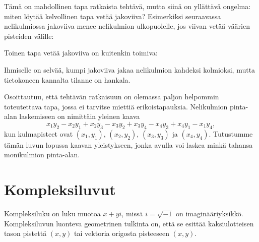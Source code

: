 Tämä on mahdollinen tapa ratkaista tehtävä,
mutta siinä on yllättävä ongelma:
miten löytää kelvollinen tapa vetää jakoviiva?
Esimerkiksi seuraavassa nelikulmiossa
jakoviiva menee nelikulmion ulkopuolelle,
jos viivan vetää väärien pisteiden välille:
\begin{center}
\end{center}
Toinen tapa vetää jakoviiva on kuitenkin toimiva:
\begin{center}
\end{center}
Ihmiselle on selvää, kumpi jakoviiva jakaa nelikulmion
kahdeksi kolmioksi, mutta tietokoneen kannalta
tilanne on hankala.

Osoittautuu, että tehtävän ratkaisuun on olemassa
paljon helpommin toteutettava tapa,
jossa ei tarvitse miettiä erikoistapauksia.
Nelikulmion pinta-alan laskemiseen
on nimittäin yleinen kaava
\[x_1y_2-x_2y_1+x_2y_3-x_3y_2+x_3y_4-x_4y_3+x_4y_1-x_1y_4,\]
kun kulmapisteet ovat
$(x_1,y_1)$,
$(x_2,y_2)$,
$(x_3,y_3)$ ja
$(x_4,y_4)$.
Tutustumme tämän luvun lopussa kaavan yleistykseen,
jonka avulla voi laskea minkä tahansa
monikulmion pinta-alan.

\section{Kompleksiluvut}


Kompleksiluku on luku muotoa $x+y i$, missä $i = \sqrt{-1}$
on imaginääriyksikkö.
Kompleksiluvun luonteva geometrinen tulkinta on,
että se esittää kaksiulotteisen tason pistettä $(x,y)$
tai vektoria origosta pisteeseen $(x,y)$.

